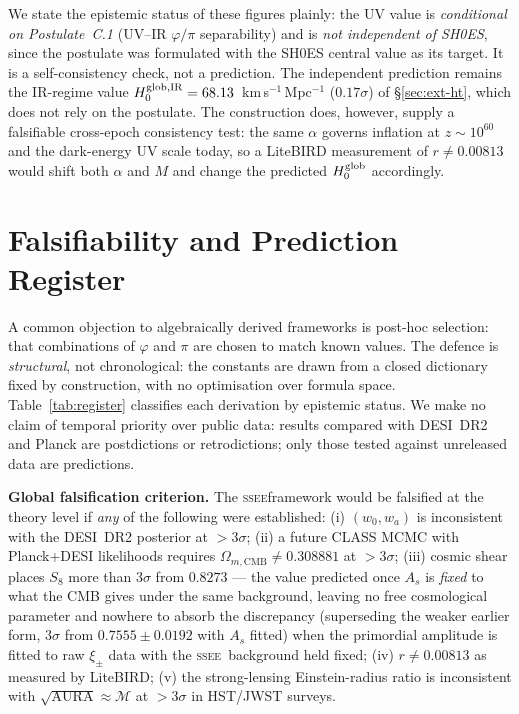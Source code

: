 \documentclass[12pt,a4paper]{article}
\newcommand{\SSEE}{\textsc{ssee}}
\newcommand{\phiG}{\varphi}
\newcommand{\MIRA}{\mathcal{M}}
\newcommand{\AURA}{\mathrm{AURA}}
\newcommand{\wz}{w_0}
\newcommand{\wa}{w_a}
\begin{document}
We state the epistemic status of these figures plainly: the UV value is
\emph{conditional on Postulate~C.1} (UV--IR $\phiG/\pi$ separability) and is
\emph{not independent of SH0ES}, since the postulate was formulated with the
SH0ES central value as its target. It is a self-consistency check, not a
prediction. The independent prediction remains the IR-regime value
$H_0^{\rm glob,IR}=68.13$~km\,s$^{-1}$\,Mpc$^{-1}$ ($0.17\sigma$) of \S\ref{sec:ext-ht}, which does
not rely on the postulate. The construction does, however, supply a falsifiable
cross-epoch consistency test: the same $\alpha$ governs inflation at $z\sim10^{60}$
and the dark-energy UV scale today, so a LiteBIRD measurement of $r\neq0.00813$
would shift both $\alpha$ and $M$ and change the predicted $H_0^{\rm glob}$
accordingly.

\section{Falsifiability and Prediction Register}
\label{sec:falsify}

A common objection to algebraically derived frameworks is post-hoc selection:
that combinations of $\phiG$ and $\pi$ are chosen to match known values.
The defence is \emph{structural}, not chronological: the constants are drawn from a
closed dictionary fixed by construction, with no optimisation over formula space.
Table~\ref{tab:register} classifies each derivation by epistemic status. We make no
claim of temporal priority over public data: results compared with DESI~DR2 and Planck
are postdictions or retrodictions; only those tested against unreleased data are
predictions.

\textbf{Global falsification criterion.} The \SSEE framework would be
falsified at the theory level if \textit{any} of the following were established:
(i) $(\wz, \wa)$ is inconsistent with the DESI~DR2 posterior at $>3\sigma$;
(ii) a future CLASS MCMC with Planck+DESI likelihoods requires
$\Omega_{m,\mathrm{CMB}} \neq 0.308881$ at $>3\sigma$;
(iii) cosmic shear places $S_8$ more than $3\sigma$ from $0.8273$ --- the value predicted once $A_s$ is \emph{fixed} to what the CMB gives under the same background, leaving no free cosmological parameter and nowhere to absorb the discrepancy (superseding the weaker earlier form, $3\sigma$ from $0.7555\pm0.0192$ with $A_s$ fitted)
when the primordial amplitude is fitted to raw $\xi_\pm$ data with the \SSEE\
background held fixed;
(iv) $r \neq 0.00813$ as measured by LiteBIRD;
(v) the strong-lensing Einstein-radius ratio is inconsistent with
$\sqrt{\AURA}\approx\MIRA$ at $>3\sigma$ in HST/JWST surveys.
\end{document}
